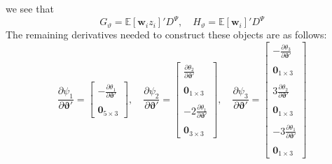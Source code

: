 \documentclass[12pt]{article}
\begin{document}
we see that
\[
  G_\vartheta = \mathbb{E}[\mathbf{w}_i z_i]' D^\Psi, \quad H_\vartheta = \mathbb{E}[\mathbf{w}_i]' D^\Psi
\]
The remaining derivatives needed to construct these objects are as follows:
\[
  \frac{\partial \psi_1}{\partial \boldsymbol{\vartheta}'} = \left[
  \begin{array}{r}
    \displaystyle -\frac{\partial\theta_1}{\partial \boldsymbol{\vartheta}'}\\ \\
    \mathbf{0}_{5\times 3}
  \end{array}
\right], \quad
  \frac{\partial \psi_2}{\partial \boldsymbol{\vartheta}'} = \left[
  \begin{array}{r}
    \displaystyle \frac{\partial\theta_2}{\partial \boldsymbol{\vartheta}'}\\  \\
    \mathbf{0}_{1\times 3}\\ \\ 
    \displaystyle -2\frac{\partial\theta_1}{\partial \boldsymbol{\vartheta}'}\\ \\
    \mathbf{0}_{3\times 3}
  \end{array}
\right], \quad
  \frac{\partial \psi_3}{\partial \boldsymbol{\vartheta}'} = \left[
  \begin{array}{r}
    -\displaystyle \frac{\partial\theta_3}{\partial \boldsymbol{\vartheta}'}\\  \\
    \mathbf{0}_{1\times 3}\\ \\ 
    \displaystyle 3\frac{\partial\theta_2}{\partial \boldsymbol{\vartheta}'}\\ \\
    \mathbf{0}_{1\times 3} \\ \\ 
    \displaystyle -3\frac{\partial\theta_1}{\partial \boldsymbol{\vartheta}'}\\ \\
    \mathbf{0}_{1\times 3} 
  \end{array}
\right]
\]
\end{document}
